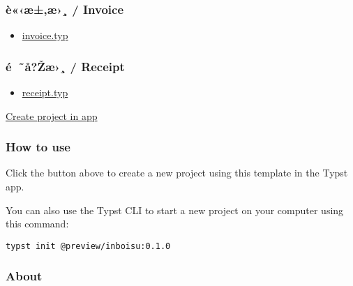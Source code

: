 \subsubsection{è«‹æ±‚æ›¸ / Invoice}\label{uxe8uxe6uxe6-invoice}


\begin{itemize}
\tightlist
\item
  \href{https://github.com/typst/packages/raw/main/packages/preview/inboisu/0.1.0/template/invoice.typ}{invoice.typ}
\end{itemize}

\subsubsection{é~˜å?Žæ›¸ / Receipt}\label{uxe9-uxe5ux17euxe6-receipt}


\begin{itemize}
\tightlist
\item
  \href{https://github.com/typst/packages/raw/main/packages/preview/inboisu/0.1.0/template/receipt.typ}{receipt.typ}
\end{itemize}

\href{/app?template=inboisu&version=0.1.0}{Create project in app}

\subsubsection{How to use}\label{how-to-use}

Click the button above to create a new project using this template in
the Typst app.

You can also use the Typst CLI to start a new project on your computer
using this command:

\begin{verbatim}
typst init @preview/inboisu:0.1.0
\end{verbatim}



\subsubsection{About}\label{about}

